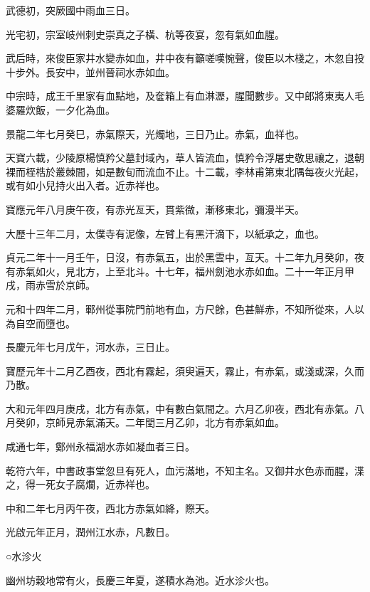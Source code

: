 \begin{pinyinscope}
 武德初，突厥國中雨血三日。



 光宅初，宗室岐州刺史崇真之子橫、杭等夜宴，忽有氣如血腥。



 武后時，來俊臣家井水變赤如血，井中夜有籲嗟嘆惋聲，俊臣以木棧之，木忽自投十步外。長安中，並州晉祠水赤如血。



 中宗時，成王千里家有血點地，及奩箱上有血淋瀝，腥聞數步。又中郎將東夷人毛婆羅炊飯，一夕化為血。



 景龍二年七月癸巳，赤氣際天，光燭地，三日乃止。赤氣，血祥也。



 天寶六載，少陵原楊慎矜父墓封域內，草人皆流血，慎矜令浮屠史敬思禳之，退朝裸而桎梏於叢棘間，如是數旬而流血不止。十二載，李林甫第東北隅每夜火光起，或有如小兒持火出入者。近赤祥也。



 寶應元年八月庚午夜，有赤光亙天，貫紫微，漸移東北，彌漫半天。



 大歷十三年二月，太僕寺有泥像，左臂上有黑汗滴下，以紙承之，血也。



 貞元二年十一月壬午，日沒，有赤氣五，出於黑雲中，亙天。十二年九月癸卯，夜有赤氣如火，見北方，上至北斗。十七年，福州劍池水赤如血。二十一年正月甲戌，雨赤雪於京師。



 元和十四年二月，鄆州從事院門前地有血，方尺餘，色甚鮮赤，不知所從來，人以為自空而墮也。



 長慶元年七月戊午，河水赤，三日止。



 寶歷元年十二月乙酉夜，西北有霧起，須臾遍天，霧止，有赤氣，或淺或深，久而乃散。



 大和元年四月庚戌，北方有赤氣，中有數白氣間之。六月乙卯夜，西北有赤氣。八月癸卯，京師見赤氣滿天。二年閏三月乙卯，北方有赤氣如血。



 咸通七年，鄭州永福湖水赤如凝血者三日。



 乾符六年，中書政事堂忽旦有死人，血污滿地，不知主名。又御井水色赤而腥，渫之，得一死女子腐爛，近赤祥也。



 中和二年七月丙午夜，西北方赤氣如絳，際天。



 光啟元年正月，潤州江水赤，凡數日。



 ○水沴火



 幽州坊穀地常有火，長慶三年夏，遂積水為池。近水沴火也。



\end{pinyinscope}